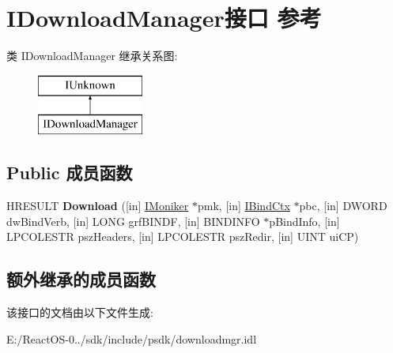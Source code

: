\hypertarget{interface_i_download_manager}{}\section{I\+Download\+Manager接口 参考}
\label{interface_i_download_manager}
类 I\+Download\+Manager 继承关系图\+:\begin{figure}[H]
\begin{center}
\leavevmode
\includegraphics[height=2.000000cm]{interface_i_download_manager}
\end{center}
\end{figure}
\subsection*{Public 成员函数}
\begin{DoxyCompactItemize}
\item 
\mbox{\label{interface_i_download_manager_a2aa2ba67f21f8a4a83e79aab39ab1ec0}} 
H\+R\+E\+S\+U\+LT {\bfseries Download} (\mbox{[}in\mbox{]} \hyperlink{interface_i_moniker}{I\+Moniker} $\ast$pmk, \mbox{[}in\mbox{]} \hyperlink{interface_i_bind_ctx}{I\+Bind\+Ctx} $\ast$pbc, \mbox{[}in\mbox{]} D\+W\+O\+RD dw\+Bind\+Verb, \mbox{[}in\mbox{]} L\+O\+NG grf\+B\+I\+N\+DF, \mbox{[}in\mbox{]} B\+I\+N\+D\+I\+N\+FO $\ast$p\+Bind\+Info, \mbox{[}in\mbox{]} L\+P\+C\+O\+L\+E\+S\+TR psz\+Headers, \mbox{[}in\mbox{]} L\+P\+C\+O\+L\+E\+S\+TR psz\+Redir, \mbox{[}in\mbox{]} U\+I\+NT ui\+CP)
\end{DoxyCompactItemize}
\subsection*{额外继承的成员函数}


该接口的文档由以下文件生成\+:\begin{DoxyCompactItemize}
\item 
E\+:/\+React\+O\+S-\/0../sdk/include/psdk/downloadmgr.\+idl\end{DoxyCompactItemize}
